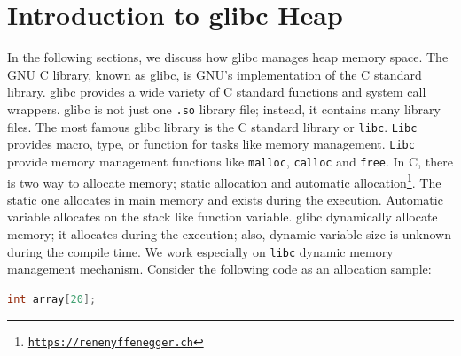 \documentclass{masterthesis}
\newcommand*\libc{glibc}
\newcommand*\mallocc{\lstinline{malloc}\xspace}
\newcommand*\callocc{\lstinline{calloc}\xspace}
\begin{document}
\chapter{Introduction to \libc{} Heap}
\label{ch:introheap}
In the following sections, we discuss how \libc{} manages heap memory space.
The GNU C library, known as \libc{}, is GNU's implementation of the C standard library. \libc{} provides a wide variety of C standard functions and system call wrappers. \libc{} is not just one \lstinline{.so} library file; instead, it contains many library files. The most famous \libc{} library is the C standard library or \lstinline{libc}. \lstinline{Libc} provides macro, type, or function for tasks like memory management.
\lstinline{Libc} provide memory management functions like \mallocc, \callocc{} and \lstinline{free}. In C, there is two way to allocate memory; static allocation and automatic allocation\footnote{\href{https://renenyffenegger.ch/notes/development/languages/C-C-plus-plus/C/libc/alloc/index}{\texttt{https://renenyffenegger.ch}}}. The static one allocates in main memory and exists during the execution. Automatic variable allocates on the stack like function variable. \libc{} dynamically allocate memory; it allocates during the execution; also, dynamic variable size is unknown during the compile time. We work especially on \lstinline{libc} dynamic memory management mechanism. Consider the following code as an allocation sample:
\begin{lstlisting}[language=c,frame=tlrb]
int array[20];
\end{lstlisting}
\end{document}
